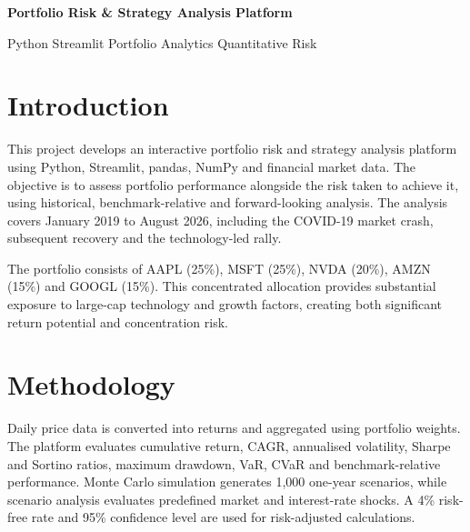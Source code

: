 \documentclass[10pt,a4paper]{article}
\begin{document}
\begin{center}

{\Large \textbf{Portfolio Risk \& Strategy Analysis Platform}}

\vspace{2pt}

{\small
Python \textbar{} Streamlit \textbar{} Portfolio Analytics
\textbar{} Quantitative Risk
}

\end{center}

\vspace{-5pt}

\section{Introduction}

This project develops an interactive portfolio risk and strategy analysis platform using Python, Streamlit, pandas, NumPy and financial market data. The objective is to assess portfolio performance alongside the risk taken to achieve it, using historical, benchmark-relative and forward-looking analysis. The analysis covers January 2019 to August 2026, including the COVID-19 market crash, subsequent recovery and the technology-led rally.

The portfolio consists of AAPL (25\%), MSFT (25\%), NVDA (20\%), AMZN (15\%) and GOOGL (15\%). This concentrated allocation provides substantial exposure to large-cap technology and growth factors, creating both significant return potential and concentration risk.

\section{Methodology}

Daily price data is converted into returns and aggregated using portfolio weights. The platform evaluates cumulative return, CAGR, annualised volatility, Sharpe and Sortino ratios, maximum drawdown, VaR, CVaR and benchmark-relative performance. Monte Carlo simulation generates 1,000 one-year scenarios, while scenario analysis evaluates predefined market and interest-rate shocks. A 4\% risk-free rate and 95\% confidence level are used for risk-adjusted calculations.
\end{document}
